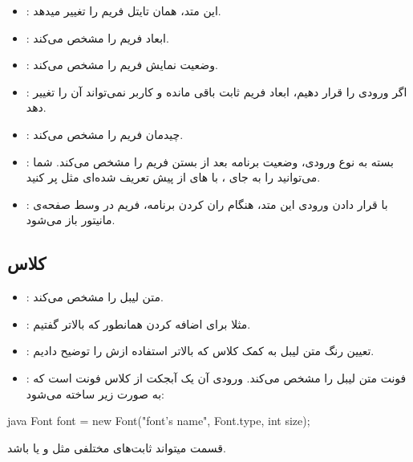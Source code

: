 \begin{itemize}
\item
   : این متد، همان تایتل فریم را
  تغییر میدهد.
\item
   : ابعاد فریم را مشخص
  می‌کند.
\item
   : وضعیت نمایش فریم را مشخص
  می‌کند.
\item
   : اگر ورودی را 
  قرار دهیم، ابعاد فریم ثابت باقی مانده و کاربر نمی‌تواند آن را تغییر
  دهد.
\item
   : چیدمان فریم را مشخص می‌کند.
\item
   : بسته به نوع
  ورودی، وضعیت برنامه بعد از بستن فریم را مشخص می‌کند. شما می‌توانید
   را به جای ، با
  ‌های از پیش تعریف شده‌ای مثل
   پر کنید.
\item
   : با
   قرار دادن ورودی این متد، هنگام ران کردن برنامه،
  فریم در وسط صفحه‌ی مانیتور باز می‌شود.
\end{itemize}

\subsection{کلاس }

\begin{itemize}
\item
   : متن لیبل را مشخص می‌کند.
\item
   : مثلا برای اضافه کردن 
  همانطور که بالاتر گفتیم.
\item
   : تعیین رنگ متن لیبل به کمک کلاس
   که بالاتر استفاده ازش را توضیح دادیم.
\item
   : فونت متن لیبل را مشخص می‌کند. ورودی آن یک
  آبجکت از کلاس فونت است که به صورت زیر ساخته می‌شود:
\end{itemize}

\begin{codebox}{java}
Font font = new Font("font's name", Font.type, int size);
\end{codebox}

قسمت  میتواند ثابت‌های مختلفی مثل  و
یا  باشد.

